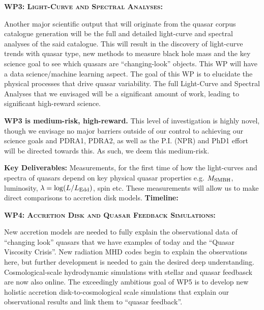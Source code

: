 \medskip 
\medskip
\smallskip
\smallskip
\noindent
\textbf{\textsc{WP3: Light-Curve and Spectral Analyses:}} 

\smallskip
\smallskip
\noindent
Another major scientific output that will originate from the quasar
corpus catalogue generation will be the full and detailed light-curve
and spectral analyses of the said catalogue. This will result in the
discovery of light-curve trends with quasar type, new methods to
measure black hole mass and the key science goal to see which quasars
are ``changing-look'' objects. This WP will have a data
science/machine learning aspect.  The goal of this WP is to elucidate
the physical processes that drive quasar variability.  The full
Light-Curve and Spectral Analyses that we envisaged will be a
significant amount of work, leading to significant high-reward
science.  

\smallskip
\smallskip
\noindent
{\bf WP3 is medium-risk, high-reward.}  
This level of investigation is highly novel, though we envisage no
major barriers outside of our control to achieving our science goals
and PDRA1, PDRA2, as well as the P.I. (NPR) and PhD1 effort will be
directed towards this.
As such, we deem this medium-risk. 

\smallskip
\smallskip
\noindent
 {\bf Key Deliverables:}
Measurements, for the first time of how the light-curves and spectra
of quasars depend on key physical quasar properties e.g. $M_{\rm
SMBH}$, luminosity, $\lambda = \log (L / L_{\rm Edd})$, spin etc.
These measurements will allow us to make direct comparisons to
accretion disk models.  {\bf Timeline:} 



\medskip 
\medskip
\smallskip
\smallskip
\noindent
\textbf{\textsc{WP4: Accretion Disk and Quasar Feedback Simulations:}} 

\smallskip
\smallskip
\noindent
New accretion models are needed to fully explain the observational
data of ``changing look'' quasars that we have examples of today and
the ``Quasar Viscosity Crisis''. New radiation MHD codes begin to
explain the observations here, but further development is needed to
gain the desired deep understanding. Cosmological-scale hydrodynamic
simulations with stellar and quasar feedbasck are now also online. The
exceedingly ambitious goal of WP5 is to develop new holistic accretion
disk-to-cosmological scale simulations that explain our observational
results and link them to ``quasar feedback''.  

